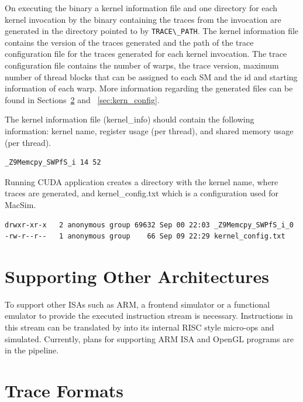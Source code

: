 On executing the binary a kernel information file and one directory for each
kernel invocation by the binary containing the traces from the invocation are
generated in the directory pointed to by \Verb+TRACE\_PATH+. The kernel
information file contains the version of the traces generated and the path of
the trace configuration file for the traces generated for each kernel
invocation. The trace configuration file contains the number of warps, the
trace version, maximum number of thread blocks that can be assigned to each SM
and the id and starting information of each warp. More information regarding
the generated files can be found in Sections~\ref{sec:traceformat} and
~\ref{sec:kern_config}. 


\ignore
{
The kernel information file (kernel\_info) should contain the following
information: kernel name, register usage (per thread), and shared memory usage
(per thread).


\begin{Verbatim}
_Z9Memcpy_SWPfS_i 14 52 
\end{Verbatim}


Running CUDA application creates a directory with the kernel name, where traces 
are generated, and kernel\_config.txt which is a configuration used for MacSim.


\begin{Verbatim}
drwxr-xr-x   2 anonymous group 69632 Sep 00 22:03 _Z9Memcpy_SWPfS_i_0
-rw-r--r--   1 anonymous group    66 Sep 09 22:29 kernel_config.txt
\end{Verbatim}
}


\section{Supporting Other Architectures}

To support other ISAs such as ARM, a frontend simulator or a
functional emulator to provide the executed instruction stream is
necessary. Instructions in this stream can be translated by \SIM into
its internal RISC style micro-ops and simulated. Currently, plans for
supporting ARM ISA and OpenGL programs are in the pipeline.


\section{Trace Formats}
\label{sec:traceformat}

